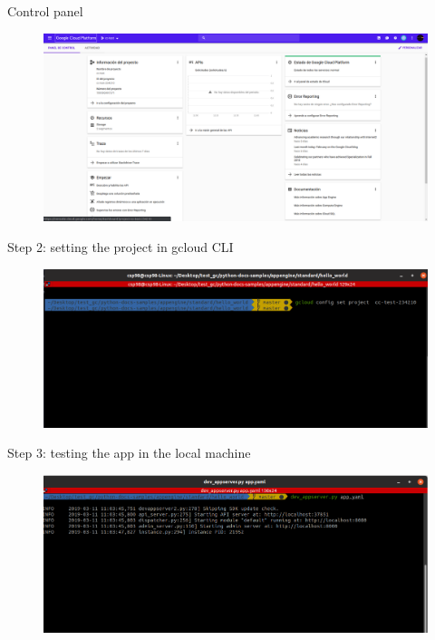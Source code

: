 \documentclass{beamer}
\begin{document}
\begin{frame}[fragile]{Control panel}
    \begin{figure}[H]
      \centering
      \includegraphics[scale=0.2]{img/tutorial/2controlpanel}
    \end{figure}
\end{frame}

\begin{frame}[fragile]{Step 2: setting the project in gcloud CLI}
    \begin{figure}[H]
      \centering
      \includegraphics[scale=0.33]{img/tutorial/3setproject}
    \end{figure}
\end{frame}

\begin{frame}[fragile]{Step 3: testing the app in the local machine}
    \begin{figure}[H]
      \centering
      \includegraphics[scale=0.33]{img/tutorial/4localdeploy}
    \end{figure}
\end{frame}
\end{document}
